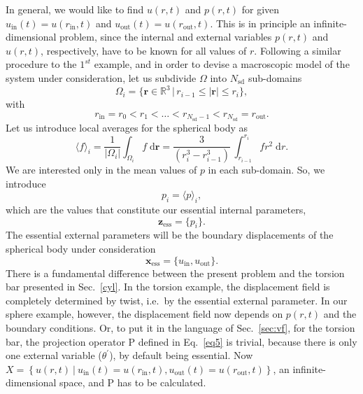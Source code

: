 \documentclass[final,1p,times]{elsarticle}
\newcommand{\be}{\begin{equation}}
\newcommand{\ee}{\end{equation}}
\newcommand{\bfm}[1]{ \mathbf{#1} }
\def\dd{\;\!\mathrm{d}}
\begin{document}
In general, we would like to find $u(r,t)$ and $p(r,t)$ for given $u_\mathrm{in}(t)=u(r_\mathrm{in},t)$ and $u_\mathrm{out}(t)=u(r_\mathrm{out},t)$. This is in principle an infinite-dimensional problem, since the internal and external variables $p(r,t)$ and $u(r,t)$, respectively, have to be known for all values of $r$. Following a similar procedure to the $1^{st}$ example, and in order to devise a macroscopic model of the system under consideration, let us subdivide $\Omega$ into $N_\mathrm{sd}$  sub-domains 
\be
\label{eq102}
\Omega_i = \{\bfm{r} \in \mathbb{R}^3 \,|\, r_{i-1} \leq |\bfm{r}| \leq r_{i}\},
\ee
with
\be
\label{eq103}
r_\mathrm{in}=r_0 < r_1 < \ldots < r_{N_\mathrm{sd}-1} < r_{N_\mathrm{sd}}=r_\mathrm{out}.
\ee
Let us introduce local averages for the spherical body as 
\be
\label{eq104}
\langle f \rangle_i =  \frac{1}{|\Omega_i|} \int_{\Omega_i} f \dd\bfm{r} = \frac{3}{(r_i^3-r_{i-1}^3)} \, \int_{r_{i-1}}^{r_i} f r^2 \dd r.
\ee
We are interested only in the mean values of $p$ in each sub-domain. So, we introduce
\be
\label{eq105}
p_i =  \langle p \rangle_i,
\ee
which are the values that constitute our essential internal parameters,
\be
\label{eq106} 
\bfm{z}_\mathrm{ess} = \{p_i\}. 
\ee
The essential external parameters will be the boundary displacements of the spherical body under consideration
\be
\label{eq107}
\bfm{x}_\mathrm{ess} = \{u_\mathrm{in},u_\mathrm{out}\}.
\ee
There is a fundamental difference between the present problem and the torsion bar presented in Sec.\ \ref{cyl}. In the torsion example, the displacement field is completely determined by twist, i.e.\ by the essential external parameter.  In our sphere example, however, the displacement field  now depends on $p(r,t)$ and the boundary conditions. Or, to put it in the language of Sec.\ \ref{sec:vf}, for the torsion bar, the projection operator $\mathrm{P}$ defined in Eq.\ \eqref{eq5} is trivial, because there is only one external variable ($\theta^\prime$), by default being essential. Now $X=\left\lbrace u(r,t) ~\left|~ u_\mathrm{in}(t)=u(r_\mathrm{in},t), u_\mathrm{out}(t)=u(r_\mathrm{out},t) \right. \right\rbrace$, an infinite-dimensional space, and $\mathrm{P}$ has to be calculated. 
\end{document}
